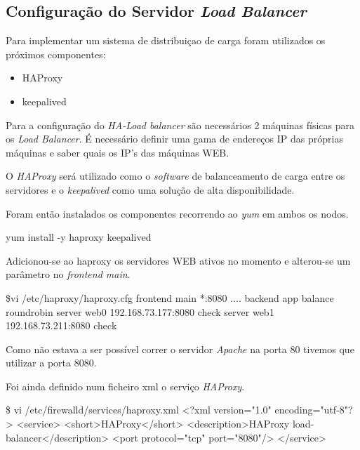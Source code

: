 \subsection{Configuração do Servidor \textit{Load Balancer}}

Para implementar um sistema de distribuiçao de carga foram utilizados os próximos componentes:

\begin{itemize}
  \item HAProxy
  \item keepalived
\end{itemize}

Para a configuração do \textit{HA-Load balancer} são necessários 2 máquinas físicas para os \textit{Load Balancer}. É necessário definir uma gama de endereços IP das próprias máquinas e saber quais os IP's das máquinas WEB.

O \textit{HAProxy} será utilizado como o \textit{software} de balanceamento de carga entre os servidores e o \textit{keepalived} como uma solução de alta disponibilidade.

Foram então instalados os componentes recorrendo ao \textit{yum} em ambos os nodos.

\begin{MyVerbatims}
  yum install -y haproxy keepalived
\end{MyVerbatims}

Adicionou-se ao haproxy os servidores WEB ativos no momento e alterou-se um parâmetro no \textit{frontend main}.

\begin{MyVerbatims}
  \$vi /etc/haproxy/haproxy.cfg
    frontend  main *:8080
    ....
    backend app
      balance     roundrobin
      server  web0 192.168.73.177:8080 check
      server  web1 192.168.73.211:8080 check
\end{MyVerbatims}

Como não estava a ser possível correr o servidor \textit{Apache} na porta 80 tivemos que utilizar a porta 8080.

Foi ainda definido num ficheiro xml o serviço \textit{HAProxy}.

\begin{MyVerbatims}
  \$ vi /etc/firewalld/services/haproxy.xml
    <?xml version="1.0" encoding="utf-8"?>
    <service>
      <short>HAProxy</short>
      <description>HAProxy load-balancer</description>
      <port protocol="tcp" port="8080"/>
    </service>
\end{MyVerbatims}

